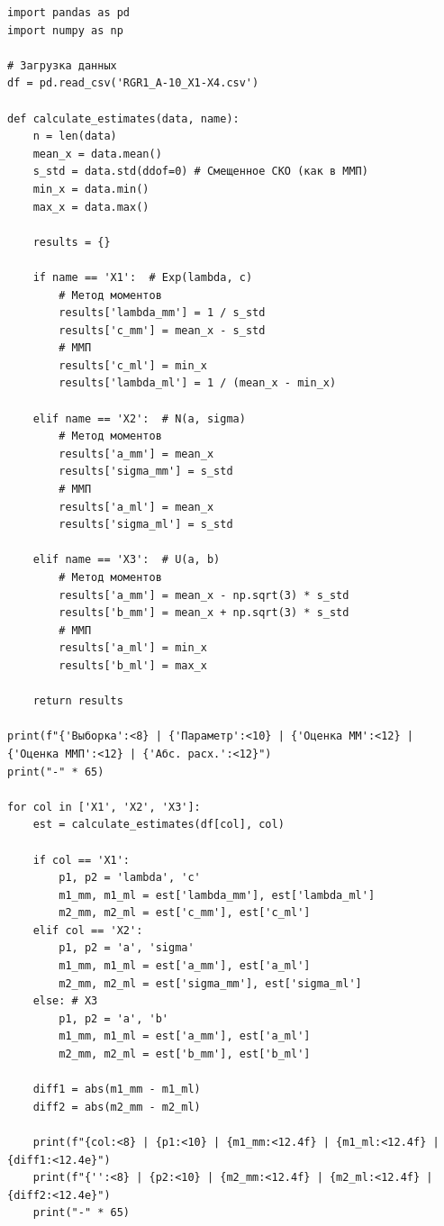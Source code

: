 \documentclass[a4paper,12pt]{article}
\begin{document}
\begin{lstlisting}[style=mypython, caption={Содержание файла 7\_estimates\_calculation.py}]
import pandas as pd
import numpy as np

# Загрузка данных
df = pd.read_csv('RGR1_A-10_X1-X4.csv')

def calculate_estimates(data, name):
    n = len(data)
    mean_x = data.mean()
    s_std = data.std(ddof=0) # Смещенное СКО (как в ММП)
    min_x = data.min()
    max_x = data.max()

    results = {}

    if name == 'X1':  # Exp(lambda, c)
        # Метод моментов
        results['lambda_mm'] = 1 / s_std
        results['c_mm'] = mean_x - s_std
        # ММП
        results['c_ml'] = min_x
        results['lambda_ml'] = 1 / (mean_x - min_x)
        
    elif name == 'X2':  # N(a, sigma)
        # Метод моментов
        results['a_mm'] = mean_x
        results['sigma_mm'] = s_std
        # ММП
        results['a_ml'] = mean_x
        results['sigma_ml'] = s_std
        
    elif name == 'X3':  # U(a, b)
        # Метод моментов
        results['a_mm'] = mean_x - np.sqrt(3) * s_std
        results['b_mm'] = mean_x + np.sqrt(3) * s_std
        # ММП
        results['a_ml'] = min_x
        results['b_ml'] = max_x

    return results

print(f"{'Выборка':<8} | {'Параметр':<10} | {'Оценка ММ':<12} | {'Оценка ММП':<12} | {'Абс. расх.':<12}")
print("-" * 65)

for col in ['X1', 'X2', 'X3']:
    est = calculate_estimates(df[col], col)
    
    if col == 'X1':
        p1, p2 = 'lambda', 'c'
        m1_mm, m1_ml = est['lambda_mm'], est['lambda_ml']
        m2_mm, m2_ml = est['c_mm'], est['c_ml']
    elif col == 'X2':
        p1, p2 = 'a', 'sigma'
        m1_mm, m1_ml = est['a_mm'], est['a_ml']
        m2_mm, m2_ml = est['sigma_mm'], est['sigma_ml']
    else: # X3
        p1, p2 = 'a', 'b'
        m1_mm, m1_ml = est['a_mm'], est['a_ml']
        m2_mm, m2_ml = est['b_mm'], est['b_ml']

    diff1 = abs(m1_mm - m1_ml)
    diff2 = abs(m2_mm - m2_ml)

    print(f"{col:<8} | {p1:<10} | {m1_mm:<12.4f} | {m1_ml:<12.4f} | {diff1:<12.4e}")
    print(f"{'':<8} | {p2:<10} | {m2_mm:<12.4f} | {m2_ml:<12.4f} | {diff2:<12.4e}")
    print("-" * 65)
\end{lstlisting}
\end{document}
